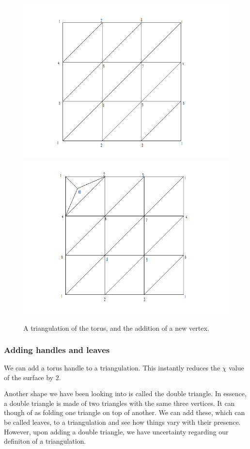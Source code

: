 \documentclass[12pt]{article}
\begin{document}
\begin{figure}
\includegraphics[scale = 0.5]{torus2.png}
\includegraphics[scale = 0.5]{torus2addvertex.png}
\caption{A triangulation of the torus, and the addition of a new vertex.}
\label{torusaddv}
\end{figure}

\subsubsection{Adding handles and leaves}
We can add a torus handle to a triangulation. This instantly reduces the $\chi$ value of the surface by 2.\newline

Another shape we have been looking into is called the double triangle. In essence, a double triangle is made of two triangles with the same three vertices. It can though of as folding one triangle on top of another. We can add these, which can be called leaves, to a triangulation and see how things vary with their presence. However, upon adding a double triangle, we have uncertainty regarding our definiton of a triangulation. 
\end{document}
